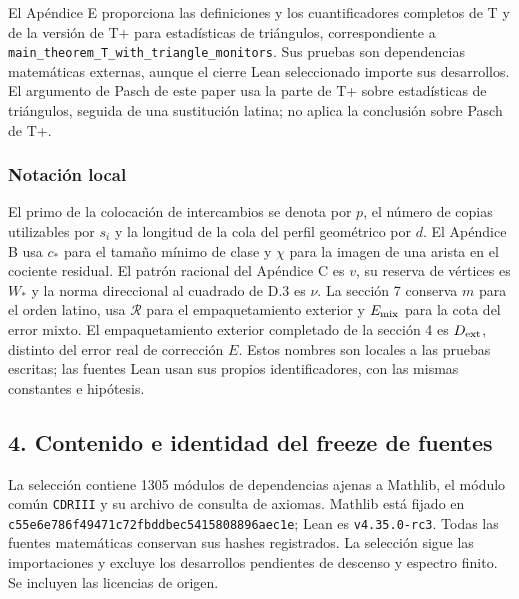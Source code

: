\documentclass[spanish,11pt,a4paper]{article}
\begin{document}
El Apéndice E proporciona las definiciones y los cuantificadores completos de T y de la versión de T+ para estadísticas de triángulos, correspondiente a \texttt{main\_\allowbreak{}theorem\_\allowbreak{}T\_\allowbreak{}with\_\allowbreak{}triangle\_\allowbreak{}monitors}. Sus pruebas son dependencias matemáticas externas, aunque el cierre Lean seleccionado importe sus desarrollos. El argumento de Pasch de este paper usa la parte de T+ sobre estadísticas de triángulos, seguida de una sustitución latina; no aplica la conclusión sobre Pasch de T+.

\subsubsection{Notación local}\label{notaciuxf3n-local}

El primo de la colocación de intercambios se denota por \(p\), el número de copias utilizables por \(s_i\) y la longitud de la cola del perfil geométrico por \(d\). El Apéndice B usa \(c_\ast\) para el tamaño mínimo de clase y \(\chi\) para la imagen de una arista en el cociente residual. El patrón racional del Apéndice C es \(v\), su reserva de vértices es \(W_\ast\) y la norma direccional al cuadrado de D.3 es \(\nu\). La sección 7 conserva \(m\) para el orden latino, usa \(\mathcal R\) para el empaquetamiento exterior y \(E_{\rm mix}\) para la cota del error mixto. El empaquetamiento exterior completado de la sección 4 es \(D_{\rm ext}\), distinto del error real de corrección \(E\). Estos nombres son locales a las pruebas escritas; las fuentes Lean usan sus propios identificadores, con las mismas constantes e hipótesis.

\subsection{4. Contenido e identidad del freeze de fuentes}\label{contenido-e-identidad-del-freeze-de-fuentes}

La selección contiene 1305 módulos de dependencias ajenas a Mathlib, el módulo común \texttt{CDRIII} y su archivo de consulta de axiomas. Mathlib está fijado en \texttt{c55e6e78\allowbreak{}6f49471c\allowbreak{}72fbddbe\allowbreak{}c5415808\allowbreak{}896aec1e}; Lean es \texttt{v4.\allowbreak{}35.\allowbreak{}0-rc3}. Todas las fuentes matemáticas conservan sus hashes registrados. La selección sigue las importaciones y excluye los desarrollos pendientes de descenso y espectro finito. Se incluyen las licencias de origen.
\end{document}
